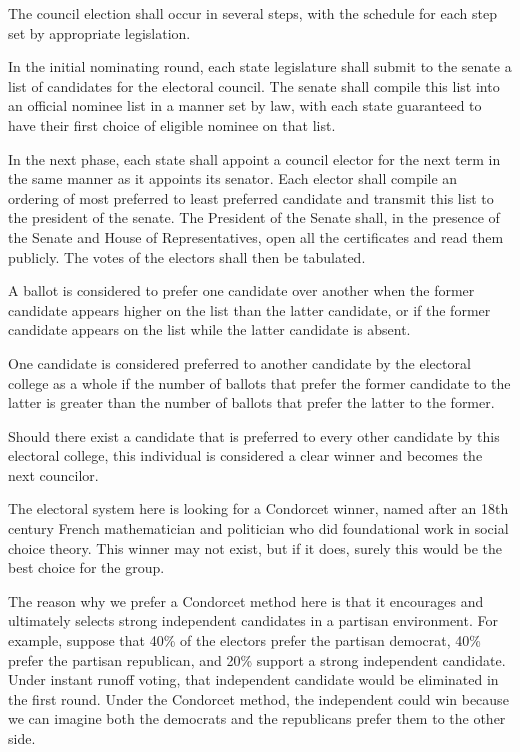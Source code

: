 \documentclass{article}
\begin{document}
\begin{quoting}
The council election shall occur in several steps, with the schedule for each step set by appropriate legislation.

In the initial nominating round, each state legislature shall submit to the senate a list of candidates for the electoral council. The senate shall compile this list into an official nominee list in a manner set by law, with each state guaranteed to have their first choice of eligible nominee on that list.

In the next phase, each state shall appoint a council elector for the next term in the same manner as it appoints its senator. Each elector shall compile an ordering of most preferred to least preferred candidate and transmit this list to the president of the senate. The President of the Senate shall, in the presence of the Senate and House of Representatives, open all the certificates and read them publicly. The votes of the electors shall then be tabulated.

A ballot is considered to prefer one candidate over another when the former candidate appears higher on the list than the latter candidate, or if the former candidate appears on the list while the latter candidate is absent.

One candidate is considered preferred to another candidate by the electoral college as a whole if the number of ballots that prefer the former candidate to the latter is greater than the number of ballots that prefer the latter to the former.

Should there exist a candidate that is preferred to every other candidate by this electoral college, this individual is considered a clear winner and becomes the next councilor.
\end{quoting}

The electoral system here is looking for a Condorcet winner, named after an 18th century French mathematician and politician who did foundational work in social choice theory. This winner may not exist, but if it does, surely this would be the best choice for the group.


The reason why we prefer a Condorcet method here is that it encourages and ultimately selects strong independent candidates in a partisan environment. For example, suppose that 40\% of the electors prefer the partisan democrat, 40\% prefer the partisan republican, and 20\% support a strong independent candidate. Under instant runoff voting, that independent candidate would be eliminated in the first round. Under the Condorcet method, the independent could win because we can imagine both the democrats and the republicans prefer them to the other side.
\end{document}
